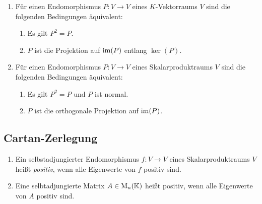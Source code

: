 \begin{proposition}
  \begin{enumerate}[leftmargin=*, label=\roman*)]
    \item
      Für einen Endomorphismus $P \colon V \to V$ eines $K$-Vektorraums $V$ sind die folgenden Bedingungen äquivalent:
      \begin{enumerate}[leftmargin=*, label=\alph*)]
        \item
          Es gilt $P^2 = P$.
        \item
          $P$ ist die Projektion auf $\operatorname{im}(P)$ entlang $\ker(P)$.
      \end{enumerate}
    \item
      Für einen Endomorphismus $P \colon V \to V$ eines Skalarproduktraums $V$ sind die folgenden Bedingungen äquivalent:
      \begin{enumerate}[leftmargin=*, label=\alph*)]
        \item
          Es gilt $P^2 = P$ und $P$ ist normal.
        \item
          $P$ ist die orthogonale Projektion auf $\operatorname{im}(P)$.
      \end{enumerate}
  \end{enumerate}
\end{proposition}












\subsection{Cartan-Zerlegung}


\begin{definition}
  \begin{enumerate}[leftmargin=*, label=\roman*)]
    \item
      Ein selbstadjungierter Endomorphismus $f \colon V \to V$ eines Skalarproduktraums $V$ heißt \emph{positiv}, wenn alle Eigenwerte von $f$ positiv sind.
    \item
      Eine selbtadjungierte Matrix $A \in \mathrm{M}_n(\mathbb{K})$ heißt positiv, wenn alle Eigenwerte von $A$ positiv sind.
  \end{enumerate}
\end{definition}





























